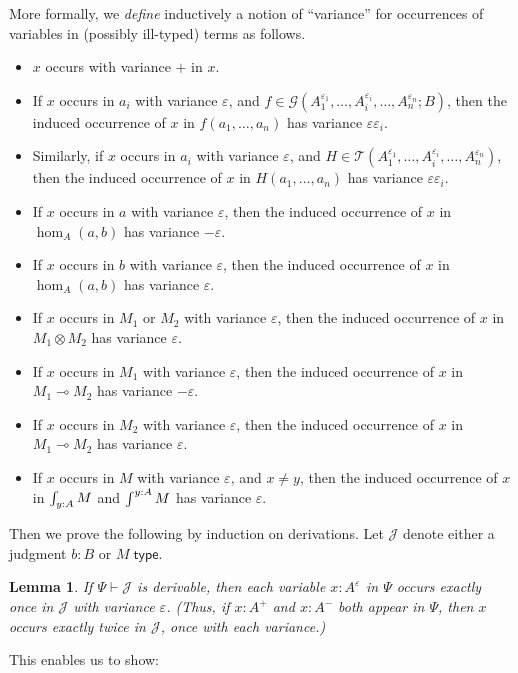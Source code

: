 \documentclass{amsart}
\let\types\vdash %
\def\p{^+} %
\def\m{^-}
\newcommand{\e}[1]{^{\varepsilon_{#1}}}
\newcommand{\ep}{\varepsilon}
\newcommand{\cG}{\ensuremath{\mathcal{G}}}
\newcommand{\cT}{\ensuremath{\mathcal{T}}}
\newcommand{\cJ}{\ensuremath{\mathcal{J}}}
\def\type{\;\mathsf{type}}
\def\mor#1{\hom_{#1}}
\newcommand{\coend}{\begingroup\textstyle\int\endgroup}
\newcommand{\End}{\begingroup\textstyle\int\endgroup}
\newtheorem{lem}{Lemma}
\theoremstyle{definition}
\begin{document}
More formally, we \emph{define} inductively a notion of ``variance'' for occurrences of variables in (possibly ill-typed) terms as follows.
\begin{itemize}
\item $x$ occurs with variance $+$ in $x$.
\item If $x$ occurs in $a_i$ with variance $\ep$, and $f\in\cG(A_1\e1,\dots,A_i\e i, \dots,A_n\e n;B)$, then the induced occurrence of $x$ in $f(a_1,\dots,a_n)$ has variance $\ep\ep_i$.
\item Similarly, if $x$ occurs in $a_i$ with variance $\ep$, and $H\in\cT(A_1\e1,\dots,A_i\e i, \dots,A_n\e n)$, then the induced occurrence of $x$ in $H(a_1,\dots,a_n)$ has variance $\ep\ep_i$.
\item If $x$ occurs in $a$ with variance $\ep$, then the induced occurrence of $x$ in $\mor A(a,b)$ has variance $-\ep$.
\item If $x$ occurs in $b$ with variance $\ep$, then the induced occurrence of $x$ in $\mor A(a,b)$ has variance $\ep$.
\item If $x$ occurs in $M_1$ or $M_2$ with variance $\ep$, then the induced occurrence of $x$ in $M_1\otimes M_2$ has variance $\ep$.
\item If $x$ occurs in $M_1$ with variance $\ep$, then the induced occurrence of $x$ in $M_1\multimap M_2$ has variance $-\ep$.
\item If $x$ occurs in $M_2$ with variance $\ep$, then the induced occurrence of $x$ in $M_1\multimap M_2$ has variance $\ep$.
\item If $x$ occurs in $M$ with variance $\ep$, and $x\neq y$, then the induced occurrence of $x$ in $\End_{y:A} M$ and $\coend^{y:A} M$ has variance $\ep$.
\end{itemize}
Then we prove the following by induction on derivations.
Let $\cJ$ denote either a judgment $b:B$ or $M\type$.

\begin{lem}\label{thm:onebind-linear}
  If $\Psi \types \cJ$ is derivable, then each variable $x:A\e{}$ in $\Psi$ occurs exactly once in $\cJ$ with variance $\ep$.
  (Thus, if $x:A\p$ and $x:A\m$ both appear in $\Psi$, then $x$ occurs exactly twice in $\cJ$, once with each variance.)
\end{lem}

This enables us to show:
\end{document}

